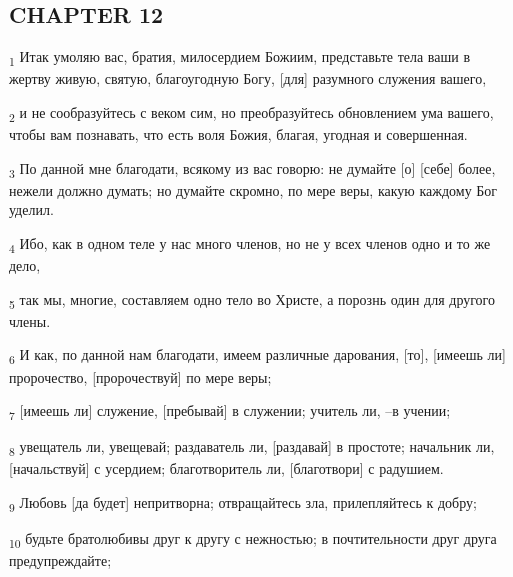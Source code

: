 \subsection{CHAPTER 12}
\begin{tcolorbox}
\textsubscript{1} Итак умоляю вас, братия, милосердием Божиим, представьте тела ваши в жертву живую, святую, благоугодную Богу, [для] разумного служения вашего,
\end{tcolorbox}
\begin{tcolorbox}
\textsubscript{2} и не сообразуйтесь с веком сим, но преобразуйтесь обновлением ума вашего, чтобы вам познавать, что есть воля Божия, благая, угодная и совершенная.
\end{tcolorbox}
\begin{tcolorbox}
\textsubscript{3} По данной мне благодати, всякому из вас говорю: не думайте [о] [себе] более, нежели должно думать; но думайте скромно, по мере веры, какую каждому Бог уделил.
\end{tcolorbox}
\begin{tcolorbox}
\textsubscript{4} Ибо, как в одном теле у нас много членов, но не у всех членов одно и то же дело,
\end{tcolorbox}
\begin{tcolorbox}
\textsubscript{5} так мы, многие, составляем одно тело во Христе, а порознь один для другого члены.
\end{tcolorbox}
\begin{tcolorbox}
\textsubscript{6} И как, по данной нам благодати, имеем различные дарования, [то], [имеешь ли] пророчество, [пророчествуй] по мере веры;
\end{tcolorbox}
\begin{tcolorbox}
\textsubscript{7} [имеешь ли] служение, [пребывай] в служении; учитель ли, --в учении;
\end{tcolorbox}
\begin{tcolorbox}
\textsubscript{8} увещатель ли, увещевай; раздаватель ли, [раздавай] в простоте; начальник ли, [начальствуй] с усердием; благотворитель ли, [благотвори] с радушием.
\end{tcolorbox}
\begin{tcolorbox}
\textsubscript{9} Любовь [да будет] непритворна; отвращайтесь зла, прилепляйтесь к добру;
\end{tcolorbox}
\begin{tcolorbox}
\textsubscript{10} будьте братолюбивы друг к другу с нежностью; в почтительности друг друга предупреждайте;
\end{tcolorbox}
